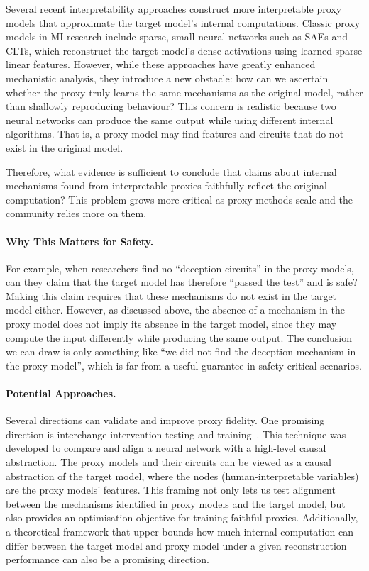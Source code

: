 Several recent interpretability approaches construct more interpretable proxy models that approximate the target model's internal computations. Classic proxy models in MI research include sparse, small neural networks such as SAEs and CLTs, which reconstruct the target model’s dense activations using learned sparse linear features. However, while these approaches have greatly enhanced mechanistic analysis, they introduce a new obstacle: how can we ascertain whether the proxy truly learns the same mechanisms as the original model, rather than shallowly reproducing behaviour? This concern is realistic because two neural networks can produce the same output while using different internal algorithms. That is, a proxy model may find features and circuits that do not exist in the original model.

Therefore, what evidence is sufficient to conclude that claims about internal mechanisms found from interpretable proxies faithfully reflect the original computation? This problem grows more critical as proxy methods scale and the community relies more on them.

\paragraph{Why This Matters for Safety.} For example, when researchers find no ``deception circuits'' in the proxy models, can they claim that the target model has therefore ``passed the test'' and is safe? Making this claim requires that these mechanisms do not exist in the target model either. However, as discussed above, the absence of a mechanism in the proxy model does not imply its absence in the target model, since they may compute the input differently while producing the same output. The conclusion we can draw is only something like ``we did not find the deception mechanism in the proxy model'', which is far from a useful guarantee in safety-critical scenarios.

\paragraph{Potential Approaches.}

Several directions can validate and improve proxy fidelity. One promising direction is interchange intervention testing and training~. This technique was developed to compare and align a neural network with a high-level causal abstraction. The proxy models and their circuits can be viewed as a causal abstraction of the target model, where the nodes (human-interpretable variables) are the proxy models' features. This framing not only lets us test alignment between the mechanisms identified in proxy models and the target model, but also provides an optimisation objective for training faithful proxies. Additionally, a theoretical framework that upper-bounds how much internal computation can differ between the target model and proxy model under a given reconstruction performance can also be a promising direction.

